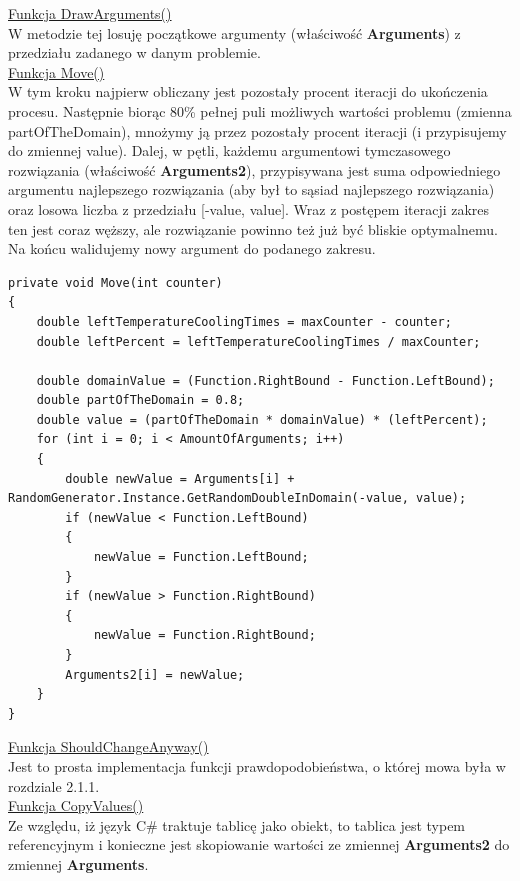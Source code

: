 \documentclass[twoside]{projektInzynierskiMS1}
\newcommand{\si}{ś}
\begin{document}
\underline{Funkcja DrawArguments()} \\
W metodzie tej losuję początkowe argumenty (wła\si ciwo\si ć \textbf{Arguments}) z przedziału zadanego w danym problemie. \\

\underline{Funkcja Move()} \\
W tym kroku najpierw obliczany jest pozostały procent iteracji do ukończenia procesu. Następnie biorąc 80\% pełnej puli możliwych warto\si ci problemu (zmienna partOfTheDomain), mnożymy ją przez pozostały procent iteracji (i przypisujemy do zmiennej value). Dalej, w pętli, każdemu argumentowi tymczasowego rozwiązania (wła\si ciwo\si ć \textbf{Arguments2}), przypisywana jest suma odpowiedniego argumentu najlepszego rozwiązania (aby był to sąsiad najlepszego rozwiązania) oraz losowa liczba z przedziału [-value, value]. Wraz z postępem iteracji zakres ten jest coraz węższy, ale rozwiązanie powinno też już być bliskie optymalnemu. Na końcu walidujemy nowy argument do podanego zakresu. \\
\begin{verbatim}
private void Move(int counter)
{
    double leftTemperatureCoolingTimes = maxCounter - counter;
    double leftPercent = leftTemperatureCoolingTimes / maxCounter;

    double domainValue = (Function.RightBound - Function.LeftBound);
    double partOfTheDomain = 0.8;
    double value = (partOfTheDomain * domainValue) * (leftPercent);
    for (int i = 0; i < AmountOfArguments; i++)
    {
        double newValue = Arguments[i] + 
RandomGenerator.Instance.GetRandomDoubleInDomain(-value, value);
        if (newValue < Function.LeftBound)
        {
            newValue = Function.LeftBound;
        }
        if (newValue > Function.RightBound)
        {
            newValue = Function.RightBound;
        }
        Arguments2[i] = newValue;
    }
}
\end{verbatim}

\underline{Funkcja ShouldChangeAnyway()} \\
Jest to prosta implementacja funkcji prawdopodobieństwa, o której mowa była w rozdziale 2.1.1. \\

\underline{Funkcja CopyValues()} \\
Ze względu, iż język C\# traktuje tablicę jako obiekt, to tablica jest typem referencyjnym i konieczne jest skopiowanie warto\si ci ze zmiennej \textbf{Arguments2} do zmiennej \textbf{Arguments}. \\
\end{document}
